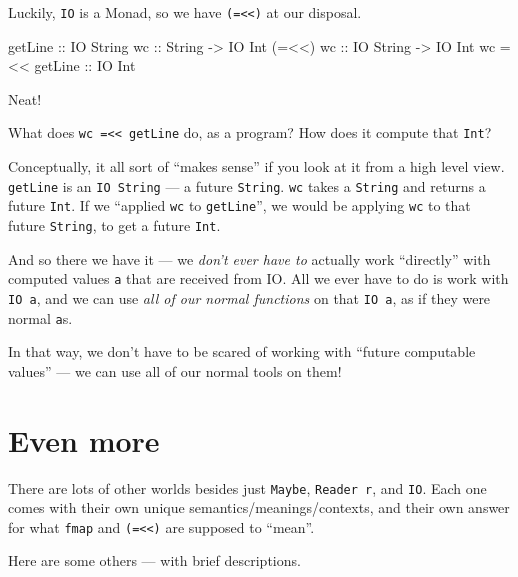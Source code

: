 \documentclass[]{article}
\newenvironment{Shaded}{}{}
\newcommand{\DataTypeTok}[1]{\textcolor[rgb]{0.56,0.13,0.00}{{#1}}}
\newcommand{\OtherTok}[1]{\textcolor[rgb]{0.00,0.44,0.13}{{#1}}}
\newcommand{\FunctionTok}[1]{\textcolor[rgb]{0.02,0.16,0.49}{{#1}}}
\newcommand{\NormalTok}[1]{{#1}}
\begin{document}
Luckily, \texttt{IO} is a Monad, so we have \texttt{(=\textless{}\textless{})} at our disposal.

\begin{Shaded}
\begin{Highlighting}[]
\NormalTok{getLine}\OtherTok{        ::} \DataTypeTok{IO} \DataTypeTok{String}
\OtherTok{wc             ::} \DataTypeTok{String} \OtherTok{->} \DataTypeTok{IO} \DataTypeTok{Int}
\NormalTok{(}\FunctionTok{=<<}\NormalTok{)}\OtherTok{ wc       ::} \DataTypeTok{IO} \DataTypeTok{String} \OtherTok{->} \DataTypeTok{IO} \DataTypeTok{Int}
\NormalTok{wc }\FunctionTok{=<<}\OtherTok{ getLine ::} \DataTypeTok{IO} \DataTypeTok{Int}
\end{Highlighting}
\end{Shaded}

Neat!

What does \texttt{wc\ =\textless{}\textless{}\ getLine} do, as a program? How does it compute that
\texttt{Int}?

Conceptually, it all sort of ``makes sense'' if you look at it from a high level view.
\texttt{getLine} is an \texttt{IO\ String} --- a future \texttt{String}. \texttt{wc} takes a
\texttt{String} and returns a future \texttt{Int}. If we ``applied \texttt{wc} to
\texttt{getLine}'', we would be applying \texttt{wc} to that future \texttt{String}, to get a future
\texttt{Int}.

And so there we have it --- we \emph{don't ever have to} actually work ``directly'' with computed
values \texttt{a} that are received from IO. All we ever have to do is work with \texttt{IO\ a}, and
we can use \emph{all of our normal functions} on that \texttt{IO\ a}, as if they were normal
\texttt{a}s.

In that way, we don't have to be scared of working with ``future computable values'' --- we can use
all of our normal tools on them!

\section{Even more}\label{even-more}

There are lots of other worlds besides just \texttt{Maybe}, \texttt{Reader\ r}, and \texttt{IO}.
Each one comes with their own unique semantics/meanings/contexts, and their own answer for what
\texttt{fmap} and \texttt{(=\textless{}\textless{})} are supposed to ``mean''.

Here are some others --- with brief descriptions.
\end{document}

